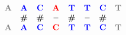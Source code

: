 \documentclass{article}
\begin{document}


\begin{align*}
\begin{matrix}
\color{gray}{\bf A} & 
\color{blue}{\bf A} & \color{blue}{\bf C}  & \color{red}{\bf A} 
&  \color{blue}{\bf T} %
& \color{blue}{\bf T} & \color{blue}{\bf C} 
& \color{gray}{\bf T}  
\\ 
& 
\textbf{\#} & \textbf{\#}  & \textbf{--} 
& \textbf{\#} %
& \textbf{--} & \textbf{\#} 
& 
\\ 
\color{gray}{\bf A} & 
\color{blue}{\bf A} & \color{blue}{\bf C}  & \color{red}{\bf C} 
& \color{blue}{\bf T} %
& \color{blue}{\bf T} & \color{blue}{\bf C} 
& \color{gray}{\bf T}  
\end{matrix}
\end{align*}
\end{document}
